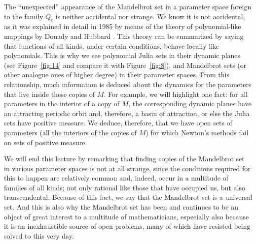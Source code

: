 \documentclass[12pt, a4paper]{article}
\begin{document}
The ``unexpected'' appearance of the Mandelbrot set in a parameter space foreign
to the family $Q_{c}$ is neither accidental nor strange. We know it is not
accidental, as it was explained in detail in 1985 by means of the theory of
polynomial-like mappings by Douady and Hubbard \cite{5}. This theory can be
summarized by saying that functions of all kinds, under certain conditions,
behave locally like polynomials. This is why we see polynomial Julia sets in
their dynamic planes (see Figure~\ref{fig:14} and compare it with
Figure~\ref{fig:8}), and Mandelbrot sets (or other analogue ones of higher
degree) in their parameter spaces. From this relationship, much information is
deduced about the dynamics for the parameters that live inside these copies of
$M$. For example, we will highlight one fact: for all parameters in the interior
of a copy of $M$, the corresponding dynamic planes have an attracting periodic
orbit and, therefore, a basin of attraction, or else the Julia sets have
positive measure. We deduce, therefore, that we have open sets of parameters
(all the interiors of the copies of $M$) for which Newton's methods fail on sets
of positive measure.

We will end this lecture by remarking that finding copies of the Mandelbrot set
in various parameter spaces is not at all strange, since the conditions required
for this to happen are relatively common and, indeed, occur in a multitude of
families of all kinds; not only rational like those that have occupied us, but
also transcendental. Because of this fact, we say that the Mandelbrot set is a
universal set. And this is also why the Mandelbrot set has been and continues to
be an object of great interest to a multitude of mathematicians, especially also
because it is an inexhaustible source of open problems, many of which have
resisted being solved to this very day.
\end{document}
